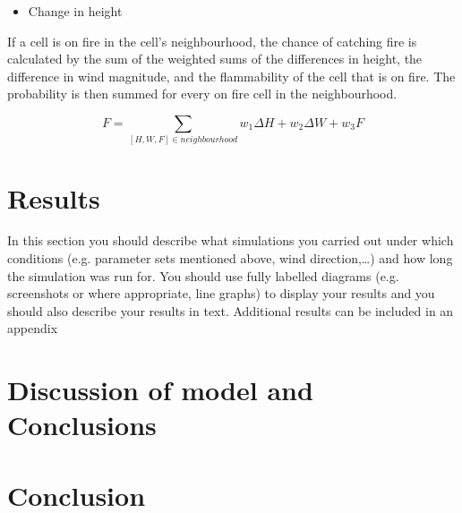 \documentclass[11pt, a4paper, titlepage]{article}
\begin{document}
\begin{itemize}
  \item Change in height
\end{itemize}
If a cell is on fire in the cell's neighbourhood, the chance of catching fire is calculated by the sum of the weighted sums of the differences in height, the difference in wind magnitude, and the flammability of the cell that is on fire. The probability is then summed for every on fire cell in the neighbourhood.

\[ F = \sum_{ [H, W, F] \in neighbourhood  } w_1 \Delta H + w_2 \Delta W + w_3 F  \]

\section{Results}
\begin{displayquote}
  In this section you should describe what simulations you
carried out under which conditions (e.g. parameter sets mentioned above, wind direction,…) and
how long the simulation was run for. You should use fully labelled diagrams (e.g. screenshots or
where appropriate, line graphs) to display your results and you should also describe your results in
text. Additional results can be included in an appendix
\end{displayquote}

\newpage
\section{Discussion of model and Conclusions} 
\section{Conclusion}

\newpage
\renewcommand{\bibname}{Bibliography}


\end{document}
